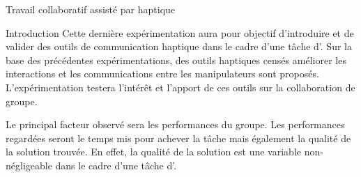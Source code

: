 \documentclass[myfrancais]{mythesis}
\begin{document}
	\begin{mychapter}{Travail collaboratif assisté par haptique}
		\begin{mysection}{Introduction}
			Cette dernière expérimentation aura pour objectif d'introduire et de valider des outils de communication haptique dans le cadre d'une tâche d'.
			Sur la base des précédentes expérimentations, des outils haptiques censés améliorer les interactions et les communications entre les manipulateurs sont proposés.
			L'expérimentation testera l'intérêt et l'apport de ces outils sur la collaboration de groupe.

			Le principal facteur observé sera les performances du groupe.
			Les performances regardées seront le temps mis pour achever la tâche mais également la qualité de la solution trouvée.
			En effet, la qualité de la solution est une variable non-négligeable dans le cadre d'une tâche d'.


\end{mysection}
\end{mychapter}
\end{document}
